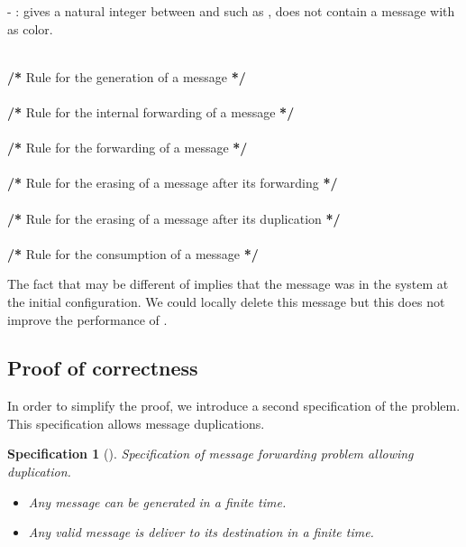 \documentclass[11pt]{article}
\newtheorem{specification}{Specification}
\begin{document}
\begin{algorithm}
{\begin{description}
- : gives a natural integer  between  and  such as ,  does not contain a message with  as color.
\item [Rules:] ~\\
\textbf{/{*}} Rule for the generation of a message \textbf{{*}/}\\
\\
\textbf{/{*}} Rule for the internal forwarding of a message \textbf{{*}/}\\
\\
\textbf{/{*}} Rule for the forwarding of a message \textbf{{*}/}\\
\\
\textbf{/{*}} Rule for the erasing of a message after its forwarding
\textbf{{*}/}\\
\\
\textbf{/{*}} Rule for the erasing of a message after its duplication
\textbf{{*}/}\\
\\
\textbf{/{*}} Rule for the consumption of a message \textbf{{*}/}\\

\end{description}

 The fact that  may be different of  implies that the message was in the system at the initial configuration. We could locally delete this message but this does not improve the performance of \AN.}
\end{algorithm}

\subsection{Proof of correctness}

In order to simplify the proof, we introduce a second specification of the problem. This specification allows message duplications.

\begin{specification} [\textbf{}] \label{specif:spe1}
Specification of message forwarding problem allowing duplication.
\begin{itemize}
\item Any message can be generated in a finite time.
\item Any valid message is deliver to its destination in a finite time.
\end{itemize}
\end{specification}
\end{document}
